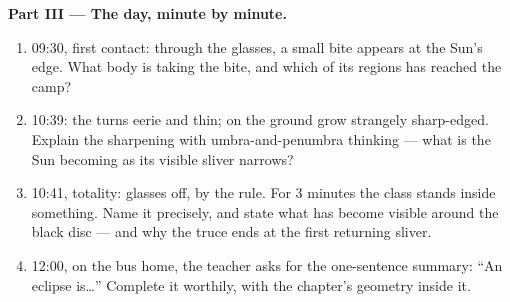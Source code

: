 \begin{problem}
\medskip\noindent\textbf{Part III --- The day, minute by
minute.}
\begin{enumerate}[resume]
  \item 09:30, first contact: through the glasses, a small bite
        appears at the Sun's edge. What body is taking the
        bite, and which of its  regions has reached the
        camp?
  \item 10:39: the  turns eerie and thin;  on the
        ground grow strangely sharp-edged. Explain the
        sharpening with umbra-and-penumbra thinking --- what is
        the Sun becoming as its visible sliver narrows?
  \item 10:41, totality: glasses off, by the rule. For $3$
        minutes the class stands inside something. Name it
        precisely, and state what has become visible around the
        black disc --- and why the truce ends at the first
        returning sliver.
  \item 12:00, on the bus home, the teacher asks for the
        one-sentence summary: ``An eclipse is\dots'' Complete
        it worthily, with the chapter's geometry inside it.
\end{enumerate}
\end{problem}
